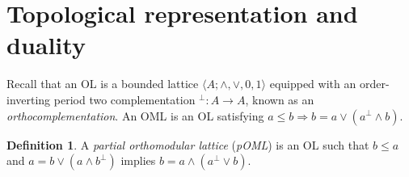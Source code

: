 \documentclass{amsart}
\theoremstyle{plain}
\theoremstyle{definition}
\newtheorem{definition}[theorem]{Definition}
\newtheorem{example}[theorem]{Example}
\begin{document}
\section{Topological representation and duality}
Recall that an OL is a bounded lattice $\langle A;\wedge,\vee,0,1\rangle$ equipped with an order-inverting period two complementation $^\perp\colon A\to A$, known as an \emph{orthocomplementation}. An OML is an OL satisfying $a\leq b\Rightarrow b=a\vee(a^{\perp}\wedge b)$. 
\begin{definition}
    A \emph{partial orthomodular lattice} (\emph{pOML}) is an OL such that  $b\leq a$ and $a=b\vee(a\wedge b^{\perp})$ implies $b=a\wedge(a^{\perp}\vee b)$.  
\end{definition}
\end{document}
